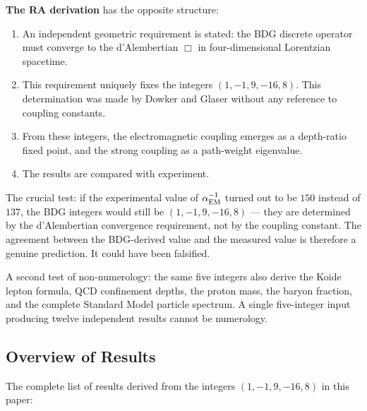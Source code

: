 \documentclass[12pt,a4paper]{article}
\begin{document}
\textbf{The RA derivation} has the opposite structure:
\begin{enumerate}
  \item An independent geometric requirement is stated: the BDG discrete operator must converge to the d'Alembertian $\Box$ in four-dimensional Lorentzian spacetime.
  \item This requirement uniquely fixes the integers $(1,-1,9,-16,8)$.  This determination was made by Dowker and Glaser \cite{Dowker2013} without any reference to coupling constants.
  \item From these integers, the electromagnetic coupling emerges as a depth-ratio fixed point, and the strong coupling as a path-weight eigenvalue.
  \item The results are compared with experiment.
\end{enumerate}
The crucial test: if the experimental value of $\alpha_{\rm EM}^{-1}$ turned out to be $150$ instead of $137$, the BDG integers would still be $(1,-1,9,-16,8)$ --- they are determined by the d'Alembertian convergence requirement, not by the coupling constant.  The agreement between the BDG-derived value and the measured value is therefore a genuine prediction.  It could have been falsified.

A second test of non-numerology: the same five integers also derive the Koide lepton formula, QCD confinement depths, the proton mass, the baryon fraction, and the complete Standard Model particle spectrum.  A single five-integer input producing twelve independent results cannot be numerology.

\subsection{Overview of Results}

The complete list of results derived from the integers $(1,-1,9,-16,8)$ in this paper:
\end{document}
